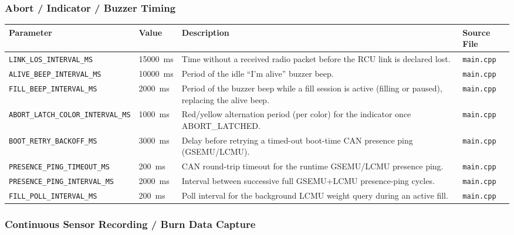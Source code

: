 ﻿\documentclass[11pt,letterpaper]{article}
\begin{document}
\subsubsection*{Abort / Indicator / Buzzer Timing}

\begingroup
\footnotesize
\begin{longtable}{@{}p{3.2cm}p{2.4cm}p{6.2cm}p{2.6cm}@{}}
\toprule
Parameter & Value & Description & Source File \\
\midrule
\texttt{LINK\_\allowbreak LOS\_\allowbreak INTERVAL\_\allowbreak MS} & 15000~ms & Time without a received radio packet before the RCU link is declared lost. & \texttt{main.cpp} \\
\texttt{ALIVE\_\allowbreak BEEP\_\allowbreak INTERVAL\_\allowbreak MS} & 10000~ms & Period of the idle ``I'm alive'' buzzer beep. & \texttt{main.cpp} \\
\texttt{FILL\_\allowbreak BEEP\_\allowbreak INTERVAL\_\allowbreak MS} & 2000~ms & Period of the buzzer beep while a fill session is active (filling or paused), replacing the alive beep. & \texttt{main.cpp} \\
\texttt{ABORT\_\allowbreak LATCH\_\allowbreak COLOR\_\allowbreak INTERVAL\_\allowbreak MS} & 1000~ms & Red/yellow alternation period (per color) for the indicator once ABORT\_\allowbreak LATCHED. & \texttt{main.cpp} \\
\texttt{BOOT\_\allowbreak RETRY\_\allowbreak BACKOFF\_\allowbreak MS} & 3000~ms & Delay before retrying a timed-out boot-time CAN presence ping (GSEMU/LCMU). & \texttt{main.cpp} \\
\texttt{PRESENCE\_\allowbreak PING\_\allowbreak TIMEOUT\_\allowbreak MS} & 200~ms & CAN round-trip timeout for the runtime GSEMU/LCMU presence ping. & \texttt{main.cpp} \\
\texttt{PRESENCE\_\allowbreak PING\_\allowbreak INTERVAL\_\allowbreak MS} & 2000~ms & Interval between successive full GSEMU+LCMU presence-ping cycles. & \texttt{main.cpp} \\
\texttt{FILL\_\allowbreak POLL\_\allowbreak INTERVAL\_\allowbreak MS} & 200~ms & Poll interval for the background LCMU weight query during an active fill. & \texttt{main.cpp} \\
\end{longtable}
\endgroup

\subsubsection*{Continuous Sensor Recording / Burn Data Capture}
\end{document}

